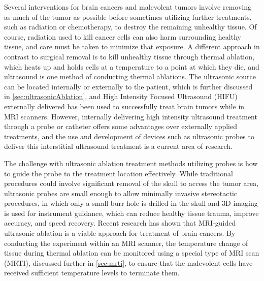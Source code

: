 \documentclass[12pt]{report}
\begin{document}
Several interventions for brain cancers and malevolent tumors involve removing as much of the tumor as possible before sometimes utilizing further treatments, such as radiation or chemotherapy, to destroy the remaining unhealthy tissue. Of course, radiation used to kill cancer cells can also harm surrounding healthy tissue, and care must be taken to minimize that exposure. A different approach in contrast to surgical removal is to kill unhealthy tissue through thermal ablation, which heats up and holds cells at a temperature to a point at which they die, and ultrasound is one method of conducting thermal ablations. \cite{thermalAblation} The ultrasonic source can be located internally or externally to the patient, which is further discussed in \autoref{sec:ultrasonicAblation}, and High Intensity Focused Ultrasound (HIFU) externally delivered has been used to successfully treat brain tumors while in MRI scanners. \cite{thermalMRIAblation} However, internally delivering high intensity ultrasound treatment through a probe or catheter offers some advantages over externally applied treatments, and the use and development of devices such as ultrasonic probes to deliver this interstitial ultrasound treatment is a current area of research. \cite{interstitialAblation} \cite{catheterAblation}

The challenge with ultrasonic ablation treatment methods utilizing probes is how to guide the probe to the treatment location effectively. While traditional procedures could involve significant removal of the skull to access the tumor area, ultrasonic probes are small enough to allow minimally invasive stereotactic procedures, in which only a small burr hole is drilled in the skull and 3D imaging is used for instrument guidance, which can reduce healthy tissue trauma, improve accuracy, and speed recovery. \cite{texasOncology} Recent research has shown that MRI-guided ultrasonic ablation is a viable approach for treatment of brain cancers. \cite{thermalMRIAblation} By conducting the experiment within an MRI scanner, the temperature change of tissue during thermal ablation can be monitored using a special type of MRI scan (MRTI), discussed further in \autoref{sec:mrti}, to ensure that the malevolent cells have received sufficient temperature levels to terminate them.
\end{document}
